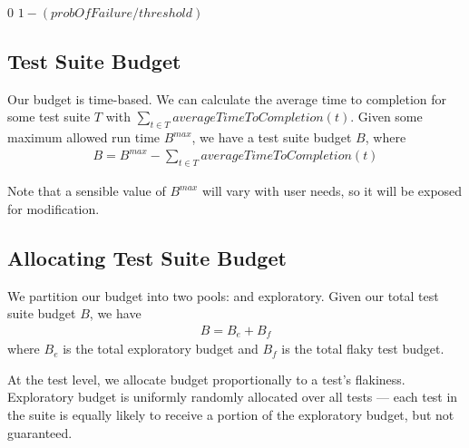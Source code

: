 {\begin{defn}[\Flakiness]
\end{defn}

\begin{algorithm}[h]
\caption{}
\label{alg:calculate_flakiness}

\begin{algorithmic}
	\Require{$probOfFailure$ and $threshold$ are decimal values within ranges
	$[0..1]$ and $(0..1]$ respectively.}
    \Statex


		\State \Return $0$
	\Else
		\State \Return $1 - (probOfFailure / threshold)$
	\EndIf

	\EndFunction
\end{algorithmic}

\end{algorithm}

\subsection{Test Suite Budget}
\label{sec:sec:budget}

Our budget is time-based. We can calculate the average time to completion for
some test suite $T$ with $\sum\limits_{t \in T} averageTimeToCompletion(t)$.
Given some maximum allowed run time $B^{max}$, we have a test suite budget $B$,
where
\begin{align*}
B = B^{max} - \sum\limits_{t \in T} averageTimeToCompletion(t)
\end{align*}

Note that a sensible value of $B^{max}$ will vary with user needs, so it will be
exposed for modification.


\subsection{Allocating Test Suite Budget}
\label{sec:sec:allocating_budget}

We partition our budget into two pools: \flaky and exploratory. Given our
total test suite budget $B$, we have
\begin{align*}
B = B_{e} + B_{f}
\end{align*}
where $B_{e}$ is the total exploratory budget and $B_{f}$ is the total flaky
test budget.

At the test level, we allocate \flaky budget proportionally to a test's
flakiness. Exploratory budget is uniformly randomly allocated over all tests ---
each test in the suite is equally likely to receive a portion of the exploratory
budget, but not guaranteed.

}

